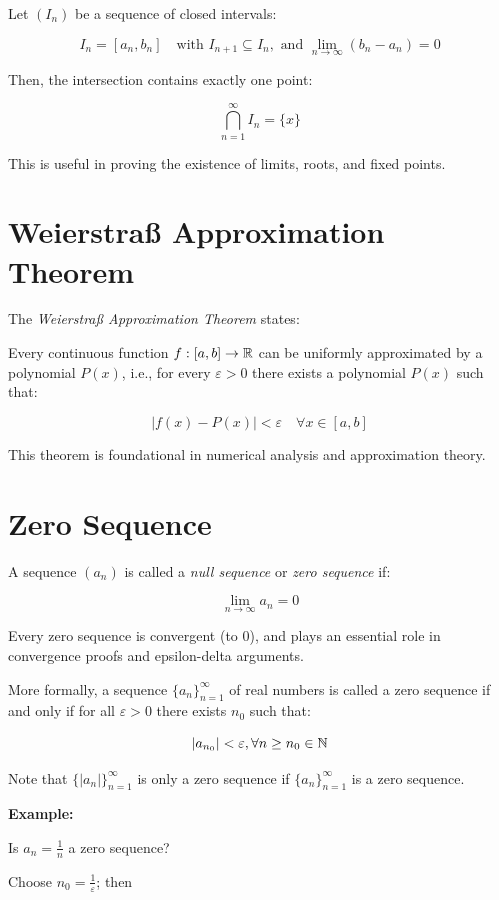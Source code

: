 Let \((I_n)\) be a sequence of closed intervals:

\[
	I_n = [a_n, b_n] \quad \text{with } I_{n+1} \subseteq I_n, \text{ and } \lim_{n \to \infty} (b_n - a_n) = 0
\]

Then, the intersection contains exactly one point:

\[
	\bigcap_{n=1}^{\infty} I_n = \{x\}
\]

This is useful in proving the existence of limits, roots, and fixed points.

\section{Weierstraß Approximation Theorem}

The \emph{Weierstraß Approximation Theorem} states:

Every continuous function \(f: [a, b] \rightarrow \mathbb{R}\) can be uniformly approximated by a
polynomial \(P(x)\), i.e., for every \(\varepsilon > 0\) there exists a polynomial \(P(x)\) such that:

\[
	|f(x) - P(x)| < \varepsilon \quad \forall x \in [a, b]
\]

This theorem is foundational in numerical analysis and approximation theory.

\section{Zero Sequence}

A sequence \((a_n)\) is called a \emph{null sequence} or \emph{zero sequence} if:

\[
	\lim_{n \to \infty} a_n = 0
\]

Every zero sequence is convergent (to 0), and plays an essential role in convergence proofs and
epsilon-delta arguments.

More formally, a sequence \(\{a_n\}_{n = 1}^{\infty}\) of real numbers is called a zero sequence if and only if for all \(\varepsilon > 0\) there exists \(n_0\)
such that:

\[
	| a_{n_0} | < \varepsilon, \forall n \ge n_0 \in \mathbb{N}
\]

Note that \(\{|a_n|\}_{n = 1}^{\infty}\) is only a zero sequence if \(\{a_n\}_{n = 1}^{\infty}\) is a zero sequence.

\textbf{Example:}

Is \(a_n = \frac{1}{n}\) a zero sequence?

Choose \(n_0 = \frac{1}{\varepsilon}\); then

